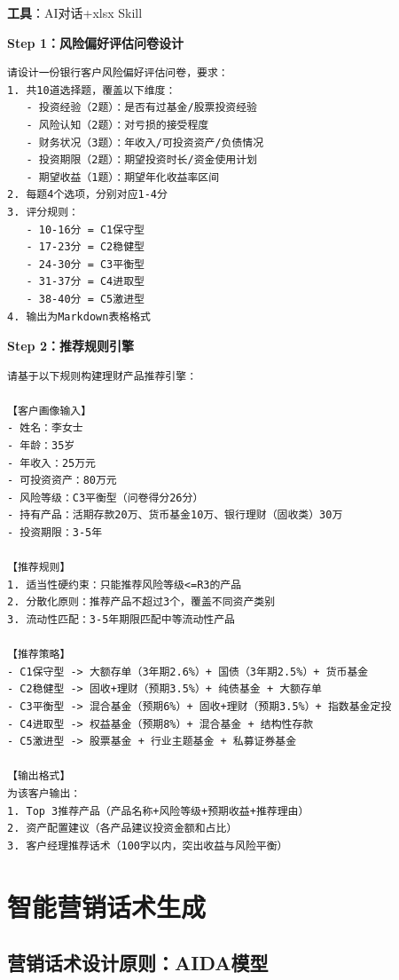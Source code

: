 \begin{practicebox}[实操：理财产品智能推荐系统]
\textbf{工具}：AI对话+xlsx Skill

\textbf{Step 1：风险偏好评估问卷设计}

\begin{lstlisting}
请设计一份银行客户风险偏好评估问卷，要求：
1. 共10道选择题，覆盖以下维度：
   - 投资经验（2题）：是否有过基金/股票投资经验
   - 风险认知（2题）：对亏损的接受程度
   - 财务状况（3题）：年收入/可投资资产/负债情况
   - 投资期限（2题）：期望投资时长/资金使用计划
   - 期望收益（1题）：期望年化收益率区间
2. 每题4个选项，分别对应1-4分
3. 评分规则：
   - 10-16分 = C1保守型
   - 17-23分 = C2稳健型
   - 24-30分 = C3平衡型
   - 31-37分 = C4进取型
   - 38-40分 = C5激进型
4. 输出为Markdown表格格式
\end{lstlisting}

\textbf{Step 2：推荐规则引擎}

\begin{lstlisting}
请基于以下规则构建理财产品推荐引擎：

【客户画像输入】
- 姓名：李女士
- 年龄：35岁
- 年收入：25万元
- 可投资资产：80万元
- 风险等级：C3平衡型（问卷得分26分）
- 持有产品：活期存款20万、货币基金10万、银行理财（固收类）30万
- 投资期限：3-5年

【推荐规则】
1. 适当性硬约束：只能推荐风险等级<=R3的产品
2. 分散化原则：推荐产品不超过3个，覆盖不同资产类别
3. 流动性匹配：3-5年期限匹配中等流动性产品

【推荐策略】
- C1保守型 -> 大额存单（3年期2.6%）+ 国债（3年期2.5%）+ 货币基金
- C2稳健型 -> 固收+理财（预期3.5%）+ 纯债基金 + 大额存单
- C3平衡型 -> 混合基金（预期6%）+ 固收+理财（预期3.5%）+ 指数基金定投
- C4进取型 -> 权益基金（预期8%）+ 混合基金 + 结构性存款
- C5激进型 -> 股票基金 + 行业主题基金 + 私募证券基金

【输出格式】
为该客户输出：
1. Top 3推荐产品（产品名称+风险等级+预期收益+推荐理由）
2. 资产配置建议（各产品建议投资金额和占比）
3. 客户经理推荐话术（100字以内，突出收益与风险平衡）
\end{lstlisting}
\end{practicebox}

\section{智能营销话术生成}

\subsection{营销话术设计原则：AIDA模型}

